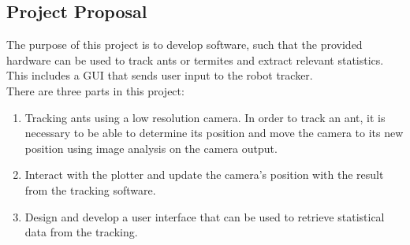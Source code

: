 
\subsection{Project Proposal}


The purpose of this project is to develop software, such that the provided hardware can be used to track ants or termites and extract relevant statistics. This includes a GUI that sends user input to the robot tracker. \\

There are three parts in this project:  

\begin{enumerate}
\item Tracking ants using a low resolution camera. In order to track an ant, it is necessary to be able to determine its position and move the camera to its new position using image analysis on the camera output. 

\item Interact with the plotter and update the camera's position with the result from the tracking software. 

\item Design and develop a user interface that can be used to retrieve statistical data from the tracking.  
\end{enumerate}
